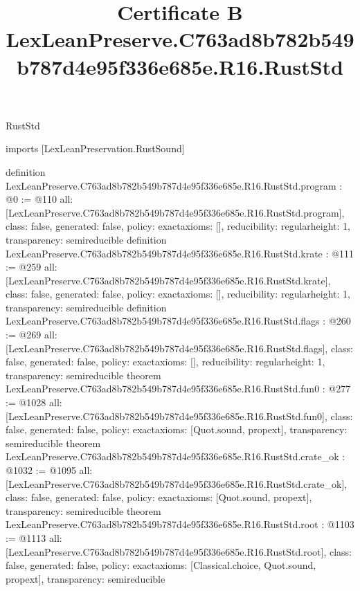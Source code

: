 \begin{lexlean}{RustStd}
\title{Certificate B LexLeanPreserve.C763ad8b782b549b787d4e95f336e685e.R16.RustStd}
\begin{coremodule}
imports [LexLeanPreservation.RustSound]

definition LexLeanPreserve.C763ad8b782b549b787d4e95f336e685e.R16.RustStd.program : @0 := @110 {
  all: [LexLeanPreserve.C763ad8b782b549b787d4e95f336e685e.R16.RustStd.program],
  class: false,
  generated: false,
  policy: exact{axioms: []},
  reducibility: regular{height: 1},
  transparency: semireducible
}
definition LexLeanPreserve.C763ad8b782b549b787d4e95f336e685e.R16.RustStd.krate : @111 := @259 {
  all: [LexLeanPreserve.C763ad8b782b549b787d4e95f336e685e.R16.RustStd.krate],
  class: false,
  generated: false,
  policy: exact{axioms: []},
  reducibility: regular{height: 1},
  transparency: semireducible
}
definition LexLeanPreserve.C763ad8b782b549b787d4e95f336e685e.R16.RustStd.flags : @260 := @269 {
  all: [LexLeanPreserve.C763ad8b782b549b787d4e95f336e685e.R16.RustStd.flags],
  class: false,
  generated: false,
  policy: exact{axioms: []},
  reducibility: regular{height: 1},
  transparency: semireducible
}
theorem LexLeanPreserve.C763ad8b782b549b787d4e95f336e685e.R16.RustStd.fun0 : @277 := @1028 {
  all: [LexLeanPreserve.C763ad8b782b549b787d4e95f336e685e.R16.RustStd.fun0],
  class: false,
  generated: false,
  policy: exact{axioms: [Quot.sound, propext]},
  transparency: semireducible
}
theorem LexLeanPreserve.C763ad8b782b549b787d4e95f336e685e.R16.RustStd.crate_ok : @1032 := @1095 {
  all: [LexLeanPreserve.C763ad8b782b549b787d4e95f336e685e.R16.RustStd.crate_ok],
  class: false,
  generated: false,
  policy: exact{axioms: [Quot.sound, propext]},
  transparency: semireducible
}
theorem LexLeanPreserve.C763ad8b782b549b787d4e95f336e685e.R16.RustStd.root : @1103 := @1113 {
  all: [LexLeanPreserve.C763ad8b782b549b787d4e95f336e685e.R16.RustStd.root],
  class: false,
  generated: false,
  policy: exact{axioms: [Classical.choice, Quot.sound, propext]},
  transparency: semireducible
}


\end{coremodule}
\end{lexlean}
